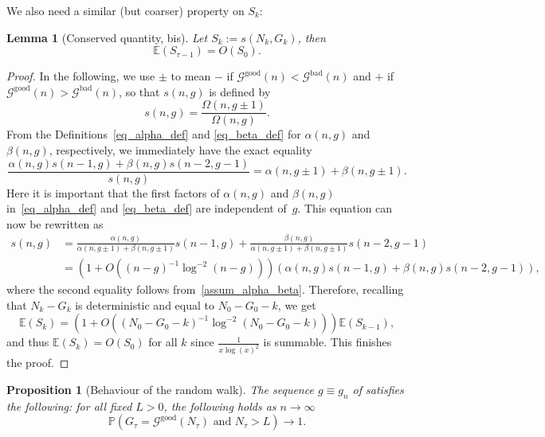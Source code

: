 \documentclass[a4paper,12pt]{article}
\newtheorem{lemma}[theorem]{Lemma}
\newtheorem{proposition}[theorem]{Proposition}
\theoremstyle{definition}
\renewcommand{\P}{\mathbb{P}}
\newcommand{\nto}{\ensuremath{n\rightarrow\infty}}
\newcommand{\bigO}[1]{O\left({#1}\right)}
\newcommand{\good}[1]{\mathcal{G}^{\text{good}}({#1})}
\newcommand{\goodG}{\good{n}}
\newcommand{\goodGNT}{\good{N_\tau}}
\newcommand{\bad}[1]{\mathcal{G}^{\text{bad}}({#1})}
\newcommand{\badG}{\bad{n}}
\begin{document}
We also need a similar (but coarser) property on $S_k$:

\begin{lemma}[Conserved quantity, bis]\label{lem_E(S)}
Let $S_k:=s(N_k,G_k)$, then
\[\mathbb{E}(S_{\tau-1})=\bigO{S_0}.\]
\end{lemma}

\begin{proof}

In the following, we use $\pm$ to mean $-$ if $\goodG<\badG$ and $+$ if $\goodG>\badG$, so that $s(n,g)$ is defined by
\[s(n,g)=\frac{\Omega(n,g\pm 1)}{\Omega(n,g)}.\] From the Definitions~\eqref{eq_alpha_def} and \eqref{eq_beta_def} for $\alpha(n,g)$ and $\beta(n,g)$, respectively, we immediately have the exact equality
\[\frac{\alpha(n,g)s(n-1,g)+\beta(n,g)s(n-2,g-1)}{s(n,g)}=\alpha(n,g\pm1)+\beta(n,g\pm1).\]
Here it is important that the first factors of $\alpha(n,g)$ and $\beta(n,g)$ in~\eqref{eq_alpha_def} and \eqref{eq_beta_def} are independent of~$g$. 
This equation can now be rewritten as
\begin{align*}
s(n,g) &=\frac{\alpha(n,g)}{\alpha(n,g\pm1)+\beta(n,g\pm1)}s(n-1,g)  + \frac{\beta(n,g)}{\alpha(n,g\pm1)+\beta(n,g\pm1)}s(n-2,g-1)\\
&=\left(1+O\left((n-g)^{-1}\log^{-2}(n-g)\right)\right)\left(\alpha(n,g)s(n-1,g)  + \beta(n,g)s(n-2,g-1)\right),
\end{align*}
where the second equality follows from~\cref{assum_alpha_beta}.
Therefore, recalling that $N_k-G_k$ is deterministic and equal to $N_0-G_0-k$, we get
\[\mathbb{E}(S_k)=\left(1+O\left((N_0-G_0-k)^{-1}\log^{-2}(N_0-G_0-k)\right)\right)\mathbb{E}(S_{k-1}),\]
and thus $\mathbb{E}(S_k)=O(S_0)$ for all $k$ since $\frac{1}{x\log(x)^2}$ is summable. This finishes the proof.
\end{proof}


\begin{proposition}[Behaviour of the random walk]\label{prop_behavior_RW}
    The sequence $g\equiv g_n$ of  satisfies the following: for all fixed $L>0$, the following holds as $\nto$
    \[\P(G_\tau=\goodGNT\text{ and } N_\tau>L)\to 1.\]
\end{proposition}
\end{document}
